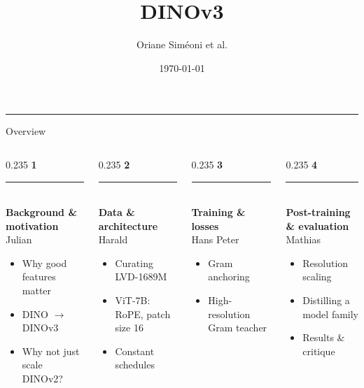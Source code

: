 \title{DINOv3}
\author{Oriane Siméoni et al.}
\date{\today}

{
\begin{frame}[plain]
  \vspace{0.8cm}
  \titlepage
  \vfill
  {\color{Accent}\rule{2.2cm}{2pt}}
\end{frame}
}

\newcommand{\overviewpart}[4]{%
  {\color{Accent}\fontsize{22}{24}\selectfont\textbf{#1}}\\[2pt]
  {\color{Accent}\rule{0.9cm}{1.2pt}}\\[4pt]
  {\small\textbf{#2}}\\[1pt]
  {\scriptsize\color{Muted}#3}\\[4pt]
  {\footnotesize
  \begin{itemize}\setlength{\itemsep}{2pt}
    #4
  \end{itemize}}}

\begin{frame}{Overview}
\vspace{0.3cm}
\begin{columns}[T,onlytextwidth]
  \begin{column}{0.235\textwidth}
    \overviewpart{1}{Background \& motivation}{Julian}{
      \item Why good features matter
      \item DINO $\to$ DINOv3
      \item Why not just scale DINOv2?}
  \end{column}
  \begin{column}{0.235\textwidth}
    \overviewpart{2}{Data \& architecture}{Harald}{
      \item Curating LVD-1689M
      \item ViT-7B: RoPE, patch size 16
      \item Constant schedules}
  \end{column}
  \begin{column}{0.235\textwidth}
    \overviewpart{3}{Training \& losses}{Hans Peter}{
      \item Gram anchoring 
      \item High-resolution Gram teacher}
  \end{column}
  \begin{column}{0.235\textwidth}
    \overviewpart{4}{Post-training \& evaluation}{Mathias}{
      \item Resolution scaling
      \item Distilling a model family
      \item Results \& critique}
  \end{column}
\end{columns}
\end{frame}

